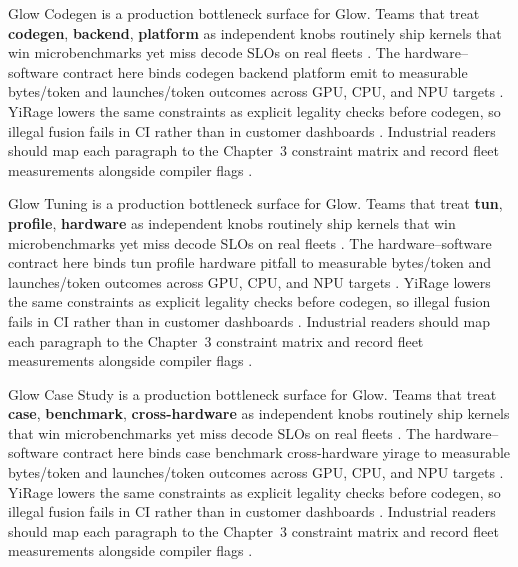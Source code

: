 Glow Codegen is a production bottleneck surface for Glow. Teams that treat \textbf{codegen}, \textbf{backend}, \textbf{platform} as independent knobs routinely ship kernels that win microbenchmarks yet miss decode SLOs on real fleets \citep{dlbook,nvidia2024cudagraphs}. The hardware--software contract here binds codegen backend platform emit to measurable bytes/token and launches/token outcomes across GPU, CPU, and NPU targets \citep{dao2022flashattention,liu2024deepseekv3}. YiRage lowers the same constraints as explicit legality checks before codegen, so illegal fusion fails in CI rather than in customer dashboards \citep{kwon2023vllm,patel2025llminference}. Industrial readers should map each paragraph to the Chapter~3 constraint matrix and record fleet measurements alongside compiler flags \citep{nvidia2024cudagraphs,taxbreak2026}.

Glow Tuning is a production bottleneck surface for Glow. Teams that treat \textbf{tun}, \textbf{profile}, \textbf{hardware} as independent knobs routinely ship kernels that win microbenchmarks yet miss decode SLOs on real fleets \citep{dao2022flashattention,liu2024deepseekv3}. The hardware--software contract here binds tun profile hardware pitfall to measurable bytes/token and launches/token outcomes across GPU, CPU, and NPU targets \citep{kwon2023vllm,patel2025llminference}. YiRage lowers the same constraints as explicit legality checks before codegen, so illegal fusion fails in CI rather than in customer dashboards \citep{nvidia2024cudagraphs,taxbreak2026}. Industrial readers should map each paragraph to the Chapter~3 constraint matrix and record fleet measurements alongside compiler flags \citep{liu2024deepseekv3,memoryfloor2026}.

Glow Case Study is a production bottleneck surface for Glow. Teams that treat \textbf{case}, \textbf{benchmark}, \textbf{cross-hardware} as independent knobs routinely ship kernels that win microbenchmarks yet miss decode SLOs on real fleets \citep{kwon2023vllm,patel2025llminference}. The hardware--software contract here binds case benchmark cross-hardware yirage to measurable bytes/token and launches/token outcomes across GPU, CPU, and NPU targets \citep{nvidia2024cudagraphs,taxbreak2026}. YiRage lowers the same constraints as explicit legality checks before codegen, so illegal fusion fails in CI rather than in customer dashboards \citep{liu2024deepseekv3,memoryfloor2026}. Industrial readers should map each paragraph to the Chapter~3 constraint matrix and record fleet measurements alongside compiler flags \citep{patel2025llminference,nvidia2022hopper}.

